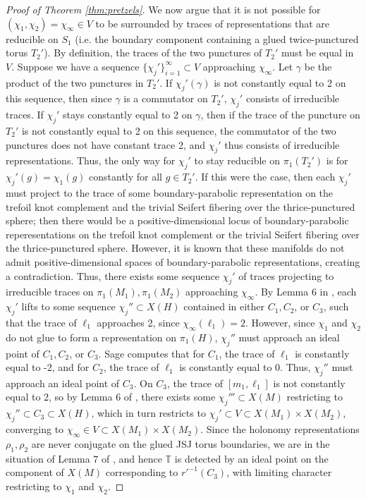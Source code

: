 \documentclass{article}
\theoremstyle{plain}
\theoremstyle{definition}
\theoremstyle{plain}
\theoremstyle{plain}
\theoremstyle{plain}
\theoremstyle{remark}
\theoremstyle{remark}
\theoremstyle{plain}
\theoremstyle{plain}
\begin{document}
\begin{proof}[Proof of Theorem \ref{thm:pretzels}]
We now argue that it is not possible for $(\chi_1, \chi_2) = \chi_\infty \in V$ to be surrounded by traces of representations that are reducible on $S_1$ (i.e. the boundary component containing a glued twice-punctured torus $T_2'$). By definition, the traces of the two punctures of $T_2'$ must be equal in $V$. Suppose we have a sequence $\{\chi_j'\}_{i=1}^\infty \subset V$ approaching $\chi_\infty$. Let $\gamma$ be the product of the two punctures in $T_2'$. If $\chi_j'(\gamma)$ is not constantly equal to 2 on this sequence, then since $\gamma$ is a commutator on $T_2'$, $\chi_j'$ consists of irreducible traces. If $\chi_j'$ stays constantly equal to 2 on $\gamma$, then if the trace of the puncture on $T_2'$ is not constantly equal to 2 on this sequence, the commutator of the two punctures does not have constant trace 2, and $\chi_j'$ thus consists of irreducible representations. Thus, the only way for $\chi_j'$ to stay reducible on $\pi_1(T_2')$ is for $\chi_j'(g) = \chi_1(g)$ constantly for all $g \in T_2'$. If this were the case, then each $\chi_j'$ must project to the trace of some boundary-parabolic representation on the trefoil knot complement and the trivial Seifert fibering over the thrice-punctured sphere; then there would be a positive-dimensional locus of boundary-parabolic reperesentations on the trefoil knot complement or the trivial Seifert fibering over the thrice-punctured sphere. However, it is known that these manifolds do not admit positive-dimensional spaces of boundary-parabolic representations, creating a contradiction. Thus, there exists some sequence $\chi_j'$ of traces projecting to irreducible traces on $\pi_1(M_1), \pi_1(M_2)$ approaching $\chi_\infty$. By Lemma 6 in \cite{Paoluzzi2010ConwaySA}, each $\chi_j'$ lifts to some sequence $\chi_j'' \subset X(H)$ contained in either $C_1, C_2$, or $C_3$, such that the trace of $\ell_1$ approaches 2, since $\chi_\infty(\ell_1) = 2$. However, since $\chi_1$ and $\chi_2$ do not glue to form a representation on $\pi_1(H)$, $\chi_j''$ must approach an ideal point of $C_1, C_2$, or $C_3$. Sage computes that for $C_1$, the trace of $\ell_1$ is constantly equal to -2, and for $C_2$, the trace of $\ell_1$ is constantly equal to 0. Thus, $\chi_j''$ must approach an ideal point of $C_3$. On $C_3$, the trace of $[m_1, \ell_1]$ is not constantly equal to 2, so by Lemma 6 of \cite{Paoluzzi2010ConwaySA}, there exists some $\chi_j''' \subset X(M)$ restricting to $\chi_j'' \subset C_3 \subset X(H)$, which in turn restricts to $\chi_j' \subset V \subset X(M_1) \times X(M_2)$, converging to $\chi_\infty \in V \subset X(M_1) \times X(M_2)$. Since the holonomy representations $\rho_1, \rho_2$ are never conjugate on the glued JSJ torus boundaries, we are in the situation of Lemma 7 of \cite{Paoluzzi2010ConwaySA}, and hence $\mathbb{T}$ is detected by an ideal point on the component of $X(M)$ corresponding to $r'^{-1}(C_3)$, with limiting character restricting to $\chi_1$ and $\chi_2$. 
\end{proof}
\end{document}
